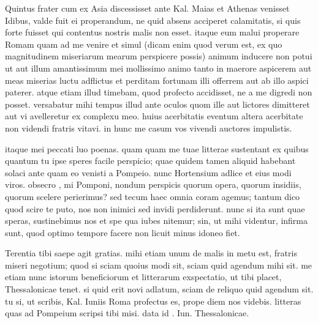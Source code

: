


 Quintus frater cum ex Asia discessisset ante Kal. Maias et Athenas venisset Idibus, valde fuit ei properandum, ne quid absens acciperet calamitatis, si quis forte fuisset qui contentus nostris malis non esset. itaque eum malui properare Romam quam ad me venire et simul (dicam enim quod verum est, ex quo magnitudinem miseriarum mearum perspicere possis) animum inducere non potui ut aut illum amantissimum mei mollissimo animo tanto in maerore aspicerem aut meas miserias luctu adflictus et perditam fortunam illi offerrem aut ab illo aspici paterer. atque etiam illud timebam, quod profecto accidisset, ne a me digredi non posset. versabatur mihi tempus illud ante oculos quom ille aut lictores dimitteret aut vi avelleretur ex complexu meo. huius acerbitatis eventum altera acerbitate non videndi fratris vitavi. in hunc me casum vos vivendi auctores impulistis.

 itaque mei peccati luo poenas. quam quam me tuae litterae sustentant ex quibus quantum tu ipse speres facile perspicio; quae quidem tamen aliquid habebant solaci ante quam eo venisti a Pompeio. nunc Hortensium adlice et eius modi viros. obsecro , mi Pomponi, nondum perspicis quorum opera, quorum insidiis, quorum scelere perierimus? sed tecum haec omnia coram agemus; tantum dico quod scire te puto, nos non inimici sed invidi perdiderunt. nunc si ita sunt quae speras, sustinebimus nos et spe qua iubes nitemur; sin, ut mihi videntur, infirma sunt, quod optimo tempore facere non licuit minus idoneo fiet.

 Terentia tibi saepe agit gratias. mihi etiam unum de malis in metu est, fratris miseri negotium; quod si sciam quoius modi sit, sciam quid agendum mihi sit. me etiam nunc istorum beneficiorum et litterarum exspectatio, ut tibi placet, Thessalonicae tenet. si quid erit novi adlatum, sciam de reliquo quid agendum sit. tu si, ut scribis, Kal. Iuniis Roma profectus es, prope diem nos videbis. litteras quas ad Pompeium scripsi tibi misi. data id . Iun. Thessalonicae.
